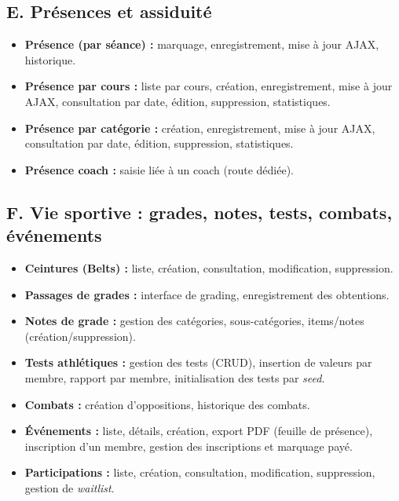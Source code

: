 \documentclass[12pt, a4paper]{article}
\begin{document}
\subsection{E. Présences et assiduité}
\begin{itemize}
    \item \textbf{Présence (par séance) :} marquage, enregistrement, mise à jour AJAX, historique.
    \item \textbf{Présence par cours :} liste par cours, création, enregistrement, mise à jour AJAX, consultation par date, édition, suppression, statistiques.
    \item \textbf{Présence par catégorie :} création, enregistrement, mise à jour AJAX, consultation par date, édition, suppression, statistiques.
    \item \textbf{Présence coach :} saisie liée à un coach (route dédiée).
\end{itemize}

\subsection{F. Vie sportive : grades, notes, tests, combats, événements}
\begin{itemize}
    \item \textbf{Ceintures (Belts) :} liste, création, consultation, modification, suppression.
    \item \textbf{Passages de grades :} interface de grading, enregistrement des obtentions.
    \item \textbf{Notes de grade :} gestion des catégories, sous-catégories, items/notes (création/suppression).
    \item \textbf{Tests athlétiques :} gestion des tests (CRUD), insertion de valeurs par membre, rapport par membre, initialisation des tests par \textit{seed}.
    \item \textbf{Combats :} création d'oppositions, historique des combats.
    \item \textbf{Événements :} liste, détails, création, export PDF (feuille de présence), inscription d'un membre, gestion des inscriptions et marquage payé.
    \item \textbf{Participations :} liste, création, consultation, modification, suppression, gestion de \textit{waitlist}.
\end{itemize}
\end{document}
